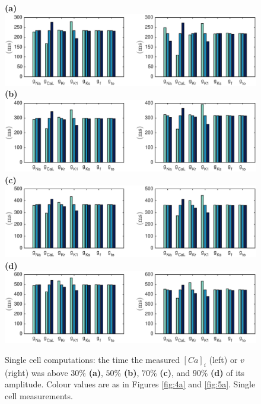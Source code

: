 \documentclass{article}
\begin{document}
\begin{figure}
 \textbf{(a)}  \includegraphics[trim=1cm 0cm 2cm 0cm, clip=true, width=1\linewidth]{sc_30p} 
 \textbf{(b)}  \includegraphics[trim=1cm 0cm 2cm 0cm, clip=true, width=1\linewidth]{sc_50p} 
 \textbf{(c)}   \includegraphics[trim=1cm 0cm 2cm 0cm, clip=true, width=1\linewidth]{sc_70p} 
  \textbf{(d)}   \includegraphics[trim=1cm 0cm 2cm 0cm, clip=true, width=1\linewidth]{sc_90p} 
    \caption{Single cell computations: the time the measured $[Ca]_i$ (left) or $v$ (right) was above $30\%$ \textbf{(a)}, $50\%$ \textbf{(b)}, $70\%$ \textbf{(c)}, and $90\%$ \textbf{(d)} of its amplitude. Colour values are as in Figures \ref{fig:4a} and \ref{fig:5a}. Single cell measurements.}
    \label{fig:7a}
\end{figure}
\end{document}
